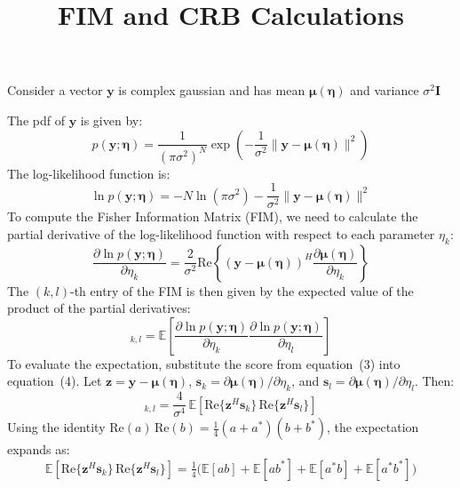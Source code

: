 \documentclass[11pt]{article}
\title{FIM and CRB Calculations}
\author{}
\date{}
\begin{document}
\maketitle
Consider a vector \(\bm{y}\) is complex gaussian and has mean \(\bm{\mu}(\bm{\eta})\) and variance \(\sigma^2\bm{I}\)

The pdf of \(\bm{y}\) is given by:
\begin{equation}
p(\bm{y}; \bm{\eta}) = \frac{1}{(\pi \sigma^2)^N} \exp\left(-\frac{1}{\sigma^2} \|\bm{y} - \bm{\mu}(\bm{\eta})\|^2\right)
\end{equation}
The log-likelihood function is:
\begin{equation}
\ln p(\bm{y}; \bm{\eta}) = -N \ln(\pi \sigma^2) - \frac{1}{\sigma^2} \|\bm{y} - \bm{\mu}(\bm{\eta})\|^2
\end{equation}
To compute the Fisher Information Matrix (FIM), we need to calculate the partial derivative of the log-likelihood function with respect to each parameter \(\eta_k\):
\begin{equation}
\frac{\partial \ln p(\bm{y}; \bm{\eta})}{\partial \eta_k} = \frac{2}{\sigma^2} \text{Re}\left\{ (\bm{y} - \bm{\mu}(\bm{\eta}))^H \frac{\partial \bm{\mu}(\bm{\eta})}{\partial \eta_k} \right\}
\end{equation}
The \((k,l)\)-th entry of the FIM is then given by the expected value of the product of the partial derivatives:
\begin{equation}
[\bm{J}(\bm{\eta})]_{k,l} = \mathbb{E}\left[ \frac{\partial \ln p(\bm{y}; \bm{\eta})}{\partial \eta_k} \frac{\partial \ln p(\bm{y}; \bm{\eta})}{\partial \eta_l} \right]
\end{equation}
To evaluate the expectation, substitute the score from equation~(3) into equation~(4). Let \(\bm{z} = \bm{y} - \bm{\mu}(\bm{\eta})\), \(\bm{s}_k = \partial \bm{\mu}(\bm{\eta}) / \partial \eta_k\), and \(\bm{s}_l = \partial \bm{\mu}(\bm{\eta}) / \partial \eta_l\). Then:
\begin{equation}
[\bm{J}(\bm{\eta})]_{k,l} = \frac{4}{\sigma^4} \, \mathbb{E}\!\left[ \text{Re}\{\bm{z}^H \bm{s}_k\} \, \text{Re}\{\bm{z}^H \bm{s}_l\} \right]
\end{equation}
Using the identity \(\text{Re}(a)\,\text{Re}(b) = \tfrac{1}{4}(a + a^*)(b + b^*)\), the expectation expands as:
\begin{equation}
\mathbb{E}\!\left[\text{Re}\{\bm{z}^H \bm{s}_k\} \, \text{Re}\{\bm{z}^H \bm{s}_l\}\right]
= \tfrac{1}{4}\Big(\mathbb{E}[ab] + \mathbb{E}[ab^*] + \mathbb{E}[a^*b] + \mathbb{E}[a^*b^*]\Big)
\end{equation}
\end{document}
